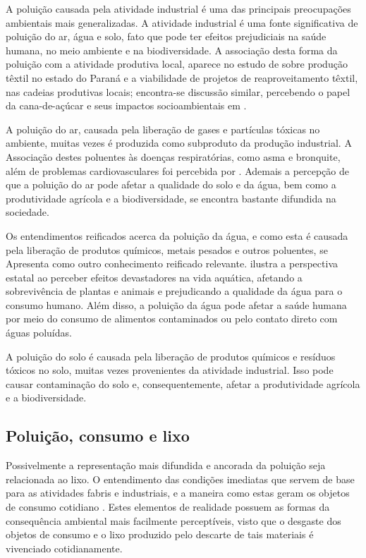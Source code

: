 \documentclass[
  12pt,       %
  openright,      %
  twoside,      %
  a4paper,      %
  english,      %
  french,       %
  spanish,      %
  brazil        %
  ]{abntex2}
\begin{document}
A poluição causada pela atividade industrial é uma das principais preocupações ambientais mais generalizadas. A atividade industrial é uma fonte significativa de poluição do ar, água e solo, fato que pode ter efeitos prejudiciais na saúde humana, no meio ambiente e na biodiversidade. A associação desta forma da poluição com a atividade produtiva local, aparece no estudo de  sobre produção têxtil no estado do Paraná e a viabilidade de projetos de reaproveitamento têxtil, nas cadeias produtivas locais; encontra-se discussão similar, percebendo o papel da cana-de-açúcar e seus impactos socioambientais em .

A poluição do ar, causada pela liberação de gases e partículas tóxicas no ambiente, muitas vezes é produzida como subproduto da produção industrial. A Associação destes poluentes às doenças respiratórias, como asma e bronquite, além de problemas cardiovasculares foi percebida por . Ademais a percepção de que a poluição do ar pode afetar a qualidade do solo e da água, bem como a produtividade agrícola e a biodiversidade, se encontra bastante difundida na sociedade.

Os entendimentos reificados acerca da poluição da água, e como esta é causada pela liberação de produtos químicos, metais pesados e outros poluentes, se Apresenta como outro conhecimento reificado relevante.  ilustra a perspectiva estatal ao perceber efeitos devastadores na vida aquática, afetando a sobrevivência de plantas e animais e prejudicando a qualidade da água para o consumo humano. Além disso, a poluição da água pode afetar a saúde humana por meio do consumo de alimentos contaminados ou pelo contato direto com águas poluídas.

A poluição do solo é causada pela liberação de produtos químicos e resíduos tóxicos no solo, muitas vezes provenientes da atividade industrial. Isso pode causar contaminação do solo e, consequentemente, afetar a produtividade agrícola e a biodiversidade.


\subsection{Poluição, consumo e lixo}

Possivelmente a representação mais difundida e ancorada da poluição seja relacionada ao lixo. O entendimento das condições imediatas que servem de base para as atividades fabris e industriais, e a maneira como estas geram os objetos de consumo cotidiano . Estes elementos de realidade possuem as formas da consequência ambiental mais facilmente perceptíveis, visto que o desgaste dos objetos de consumo e o lixo produzido pelo descarte de tais materiais é vivenciado cotidianamente.
\end{document}
